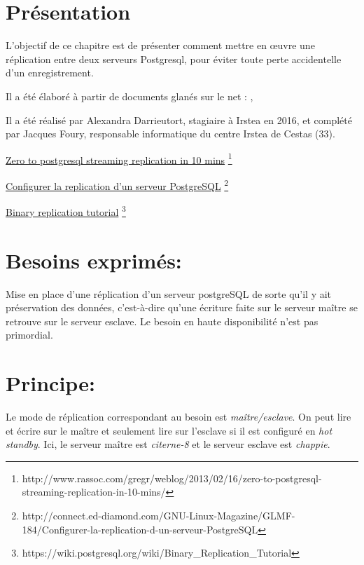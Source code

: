 \section{Présentation}
L'objectif de ce chapitre est de présenter comment mettre en œuvre une réplication entre deux serveurs Postgresql, pour éviter toute perte accidentelle d'un enregistrement.

Il a été élaboré à partir de documents glanés sur le net : \cite{digitOcean}, 

Il a été réalisé par Alexandra Darrieutort, stagiaire à Irstea en 2016, et complété par Jacques Foury, responsable informatique du centre Irstea de Cestas (33).


\href{http://www.rassoc.com/gregr/weblog/2013/02/16/zero-to-postgresql-streaming-replication-in-10-mins/}{Zero to postgresql streaming replication in 10 mins}
\footnote{http://www.rassoc.com/gregr/weblog/2013/02/16/zero-to-postgresql-streaming-replication-in-10-mins/}

\href{http://connect.ed-diamond.com/GNU-Linux-Magazine/GLMF-184/Configurer-la-replication-d-un-serveur-PostgreSQL}{Configurer la replication d'un serveur PostgreSQL}
\footnote{http://connect.ed-diamond.com/GNU-Linux-Magazine/GLMF-184/Configurer-la-replication-d-un-serveur-PostgreSQL}

\href{https://wiki.postgresql.org/wiki/Binary_Replication_Tutorial}{Binary replication tutorial}
\footnote{https://wiki.postgresql.org/wiki/Binary_Replication_Tutorial}

\section{Besoins exprimés:}

Mise en place d'une réplication d'un serveur postgreSQL de sorte qu'il y ait préservation des données, c'est-à-dire qu'une écriture faite sur le serveur maître se retrouve sur le serveur esclave. Le besoin en haute disponibilité n'est pas primordial. 

\section{Principe:}

Le mode de réplication correspondant au besoin est \textit{maître/esclave}. On peut lire et écrire sur le maître et seulement lire sur l'esclave si il est configuré en \textit{hot standby}. Ici, le serveur maître est \textit{citerne-8} et le serveur esclave est \textit{chappie}.

